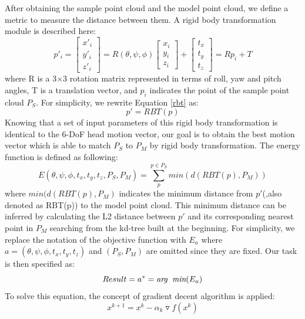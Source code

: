 After obtaining the sample point cloud and the model point cloud, we define a metric to measure the distance between them. A rigid body transformation module is described here:
\begin{equation}
p'_{i} =
\begin{bmatrix}x'_{i}\\y'_{i}\\z'_{i}\end{bmatrix}
= R(\theta,\psi,\phi)
\begin{bmatrix}x_{i}\\y_{i}\\z_{i}\end{bmatrix}
+ 
\begin{bmatrix}t_{x}\\t_{y}\\t_{z}\end{bmatrix}
= Rp_{i} + T
\label{rbt}
\end{equation}
where R is a 3$\times$3 rotation matrix represented in terms of roll, yaw and pitch angles, T is a translation vector, and $p_{i}$ indicates the point of the sample point cloud $P_{S}$. For simplicity, we rewrite Equation \ref{rbt} as:
\begin{equation}
p' = RBT(p)
\label{rbtSimple}
\end{equation}
Knowing that a set of input parameters of this rigid body transformation is identical to the 6-DoF head motion vector, our goal is to obtain the best motion vector which is able to match $P_{S}$ to $P_{M}$ by rigid body transformation. The energy function is defined as following:
\begin{equation}
E(\theta,\psi,\phi,t_{x},t_{y},t_{z},P_{S},P_{M})=\sum_{p}^{p\in P_{S}}min(d(RBT(p),P_{M}))
\end{equation}
where $min(d(RBT(p),P_{M})$ indicates the minimum distance from $p'$(,also denoted as RBT(p)) to the model point cloud. This minimum distance can be inferred by calculating the L2 distance between $p'$ and its corresponding nearest point in $P_{M}$ searching from the kd-tree built at the beginning. For simplicity, we replace the notation of the objective function with $E_{a}$ where $a=(\theta,\psi,\phi,t_{x},t_{y},t_{z})$ and $(P_{S},P_{M})$ are omitted since they are fixed. Our task is then specified as:
\begin{equation}
Result = a^{*} = \emph{arg\: min} (E_{a})
\end{equation}
To solve this equation, the concept of gradient decent algorithm is applied:
\begin{equation}
\label{gda}
x^{k+1}=x^{k}-\alpha_{k}\triangledown f(x^{k})
\end{equation}
